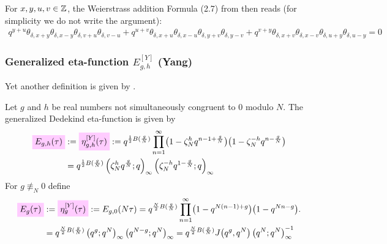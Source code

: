 \documentclass{article}
\begin{document}
For $x,y,u,v\in\mathbb{Z}$, the Weierstrass addition Formula (2.7) from
\cite{Koornwinder_ThetaIdentities_2014} then reads (for simplicity we
do not write the argument):
\begin{gather}
  q^{y+u} \theta_{\delta,x+y} \theta_{\delta,x-y}
  \theta_{\delta,v+u} \theta_{\delta,v-u}
  +
  q^{u+v} \theta_{\delta,x+u} \theta_{\delta,x-u}
  \theta_{\delta,y+v} \theta_{\delta,y-v}
  +
  q^{v+y} \theta_{\delta,x+v} \theta_{\delta,x-v}
  \theta_{\delta,u+y} \theta_{\delta,u-y}
  =
  0
\end{gather}



\subsubsection{Generalized eta-function $E_{g,h}^{[Y]}$ (Yang)}
Yet another definition is given by
\cite{Yang_GeneralizedDedekindEtaFunctions_2004}.


\begin{Definition}
  \cite{Yang_GeneralizedDedekindEtaFunctions_2004}
  Let $g$ and $h$ be real numbers not simultaneously congruent to 0
  modulo $N$.
%
The generalized Dedekind eta-function is given by
\begin{align}
  \defineNotation[E-g-h-tau]{E_{g,h}(\tau)}
  &:=
  \defineNotation[eta-g-h-tau-Yang]{\eta_{g,h}^{[Y]}(\tau)}
  :=
  q^{\frac{1}{2} B(\frac{g}{N})}
  \prod_{n=1}^\infty
    \bigl(1-\zeta_N^h q^{n-1 + \frac{g}{N}}\bigr)
    \bigl(1-\zeta_N^{-h} q^{n - \frac{g}{N}}\bigr)
  \notag\\
  &=
  q^{\frac{1}{2} B(\frac{g}{N})}
    \qPochhammer{\zeta_N^h q^{\frac{g}{N}}}{q}
    \qPochhammer{\zeta_N^{-h} q^{1-\frac{g}{N}}}{q}
  \label{eq:eta_g-h^[Y](tau)}
\end{align}
For $g \not\equiv_N 0$ define
\begin{align}
  \defineNotation[E-g-tau]{E_g(\tau)}
  &:=
  \defineNotation[eta-g-tau-Yang]{\eta_g^{[Y]}(\tau)}
  :=
  E_{g,0}(N \tau)
  =
  q^{\frac{N}{2} B(\frac{g}{N})}
  \prod_{n=1}^\infty
    \bigl(1-q^{N (n-1) + g}\bigr)
    \bigl(1-q^{N n - g}\bigr).
  \notag\\
  &=
  q^{\frac{N}{2} B(\frac{g}{N})}
    \qPochhammer{q^g}{q^N}
    \qPochhammer{q^{N-g}}{q^N}
  =
  q^{\frac{N}{2} B(\frac{g}{N})}
  \jacobiFunction{q^g}{q^N} \eulerFunction{N}^{-1}
  \label{eq:eta_g^[Y](tau)}
\end{align}
\end{Definition}
\end{document}
